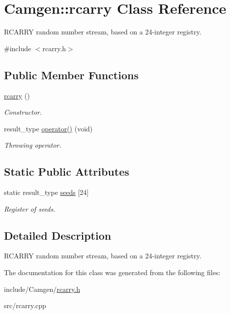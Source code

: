 \hypertarget{a00461}{\section{Camgen\-:\-:rcarry Class Reference}
\label{a00461}
}


R\-C\-A\-R\-R\-Y random number stream, based on a 24-\/integer registry.  




{\ttfamily \#include $<$rcarry.\-h$>$}

\subsection*{Public Member Functions}
\begin{DoxyCompactItemize}
\item 
\hypertarget{a00461_a0e420f36cb6c848d59a895d8c03fff03}{\hyperlink{a00461_a0e420f36cb6c848d59a895d8c03fff03}{rcarry} ()}\label{a00461_a0e420f36cb6c848d59a895d8c03fff03}

\begin{DoxyCompactList}\small\item\em Constructor. \end{DoxyCompactList}\item 
\hypertarget{a00461_a053f910e707aa0e6286d9271479cc5ae}{result\-\_\-type \hyperlink{a00461_a053f910e707aa0e6286d9271479cc5ae}{operator()} (void)}\label{a00461_a053f910e707aa0e6286d9271479cc5ae}

\begin{DoxyCompactList}\small\item\em Throwing operator. \end{DoxyCompactList}\end{DoxyCompactItemize}
\subsection*{Static Public Attributes}
\begin{DoxyCompactItemize}
\item 
\hypertarget{a00461_ade12e5b44bddb5dafc21f20a4ec20bf5}{static result\-\_\-type \hyperlink{a00461_ade12e5b44bddb5dafc21f20a4ec20bf5}{seeds} \mbox{[}24\mbox{]}}\label{a00461_ade12e5b44bddb5dafc21f20a4ec20bf5}

\begin{DoxyCompactList}\small\item\em Register of seeds. \end{DoxyCompactList}\end{DoxyCompactItemize}


\subsection{Detailed Description}
R\-C\-A\-R\-R\-Y random number stream, based on a 24-\/integer registry. 

The documentation for this class was generated from the following files\-:\begin{DoxyCompactItemize}
\item 
include/\-Camgen/\hyperlink{a00729}{rcarry.\-h}\item 
src/rcarry.\-cpp\end{DoxyCompactItemize}
